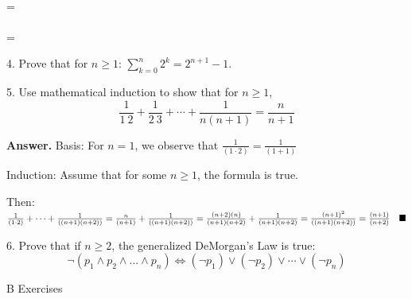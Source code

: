 \documentclass[10pt,]{book}
\theoremstyle{plain}
\theoremstyle{definition}
\theoremstyle{definition}
\theoremstyle{definition}
\theoremstyle{definition}
\begin{document}
\begin{exercisegroup}
\begin{itemize}[label=\textbullet]
\\
\text{   }=\\
\\
\text{   }=\text{   }\blacksquare\)%
\end{itemize}
%
\item[4.]\hypertarget{exercise-41}{}Prove that for \(n \geq  1\): \(\sum_{k=0}^n 2^k = 2^{n+1}-1\).
%
\par\smallskip
\item[5.]\hypertarget{exercise-42}{}Use mathematical induction to show that for \(n\geq 1\),
  \begin{equation*}\frac{1}{1\ 2 }+ \frac{1}{2\ 3}+ \cdots  + \frac{1}{n(n+1)}= \frac{n}{n+1}\end{equation*}%
\par\smallskip
\par\smallskip
\noindent\textbf{Answer.}\hypertarget{answer-20}{}\quad
 Basis:  For \(n=1\), we observe that \(\frac{1}{(1\cdot 2)}=\frac{1}{(1+1)}\)%
\par
Induction: Assume that for some \(n\geqslant 1\), the formula is true.%
\par
Then: \(\frac{1}{(1\cdot 2)}+\cdots +\frac{1}{((n+1)(n+2))}=\frac{n}{(n+1)}+\frac{1}{((n+1)(n+2))}\\
\\
      =\frac{(n+2)(n)}{(n+1)(n+2)}+\frac{1}{(n+1)(n+2)}\\
\\
      =\frac{(n+1)^2}{((n+1)(n+2))}\\
\\
      =\frac{(n+1)}{(n+2)} \quad \blacksquare\)%
\item[6.]\hypertarget{exercise-43}{} Prove that if \(n \geq  2\),  the generalized DeMorgan's Law is true:
\begin{equation*}\neg (p_1 \land p_2\land \text{...} \land p_n)\Leftrightarrow (\neg p_1)\lor  (\neg p_2) \lor  \cdots
 \lor (\neg p_n)\end{equation*}%
\par\smallskip
\end{exercisegroup}
\par\smallskip\noindent
\hypertarget{exercisegroup-10}{}\typeout{************************************************}
\typeout{************************************************}
B Exercises%
\end{document}

